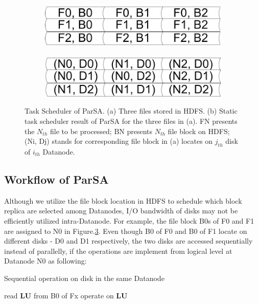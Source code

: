 \documentclass[preprint,12pt]{elsarticle}
\begin{document}
\begin{figure}[htb]
    \centering
    \begin{subfigure}{.5\textwidth}
        \includegraphics[width=\textwidth]{figure5a}
        \caption{}
        \label{figure5a}
    \end{subfigure}

    \begin{subfigure}{.5\textwidth}
        \centering
        \includegraphics[width=\textwidth]{figure5b}%
        \caption{}
        \label{figure5b}
    \end{subfigure}
    \caption{Task Scheduler of ParSA. (a) Three files stored in HDFS. (b) Static task scheduler result of ParSA for the three files in (a). FN presents the $N_{th}$ file to be processed; BN presents $N_{th}$ file block on HDFS; (Ni, Dj) stands for corresponding file block 
    in (a) locates on $j_{th}$ disk of $i_{th}$ Datanode.}
    \label{figure5}
\end{figure}

\subsection{Workflow of ParSA}
Although we utilize the file block location in HDFS to schedule which block replica are selected among Datanodes, I/O bandwidth of disks may 
not be efficiently utilized intra-Datanode. For example, the file block B0s of F0 and F1 are assigned to N0 in Figure.\ref{figure5}. Even
though B0 of F0 and B0 of F1 locate on different disks - D0 and D1 respectively, the two disks are accessed sequentially instead of 
parallelly, if the operations are implement from logical level at Datanode N0 as following:

\begin{algorithm}[htb]
\caption{Sequential operation on disk in the same Datanode} 
\label{alg:sequential-operation}
\begin{algorithmic}
\STATE read \textbf{LU} from B0 of Fx
\STATE operate on \textbf{LU} 
\ENDFOR
\ENDFOR
\end{algorithmic}
\end{algorithm}
\end{document}
